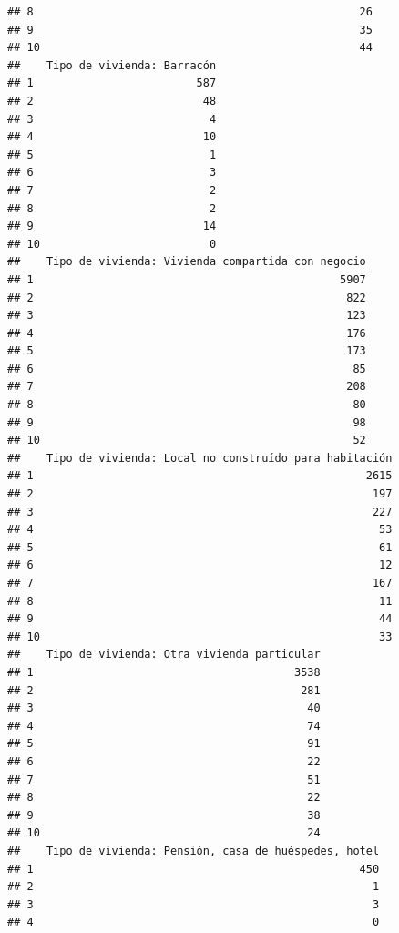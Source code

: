 \documentclass[11pt,]{article}
\begin{document}
\begin{verbatim}
## 8                                                  26
## 9                                                  35
## 10                                                 44
##    Tipo de vivienda: Barracón
## 1                         587
## 2                          48
## 3                           4
## 4                          10
## 5                           1
## 6                           3
## 7                           2
## 8                           2
## 9                          14
## 10                          0
##    Tipo de vivienda: Vivienda compartida con negocio
## 1                                               5907
## 2                                                822
## 3                                                123
## 4                                                176
## 5                                                173
## 6                                                 85
## 7                                                208
## 8                                                 80
## 9                                                 98
## 10                                                52
##    Tipo de vivienda: Local no construído para habitación
## 1                                                   2615
## 2                                                    197
## 3                                                    227
## 4                                                     53
## 5                                                     61
## 6                                                     12
## 7                                                    167
## 8                                                     11
## 9                                                     44
## 10                                                    33
##    Tipo de vivienda: Otra vivienda particular
## 1                                        3538
## 2                                         281
## 3                                          40
## 4                                          74
## 5                                          91
## 6                                          22
## 7                                          51
## 8                                          22
## 9                                          38
## 10                                         24
##    Tipo de vivienda: Pensión, casa de huéspedes, hotel
## 1                                                  450
## 2                                                    1
## 3                                                    3
## 4                                                    0

\end{verbatim}
\end{document}
